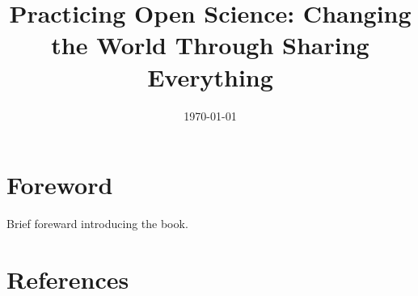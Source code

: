 \documentclass[letterpaper,10pt]{book}
\title{\textbf{Practicing Open Science:
Changing the World Through Sharing Everything}}
\date{\today}
\begin{document}
\maketitle

\newpage
\tableofcontents
\newpage

\section*{Foreword}

Brief foreward introducing the book.









\section*{References}


\end{document}
